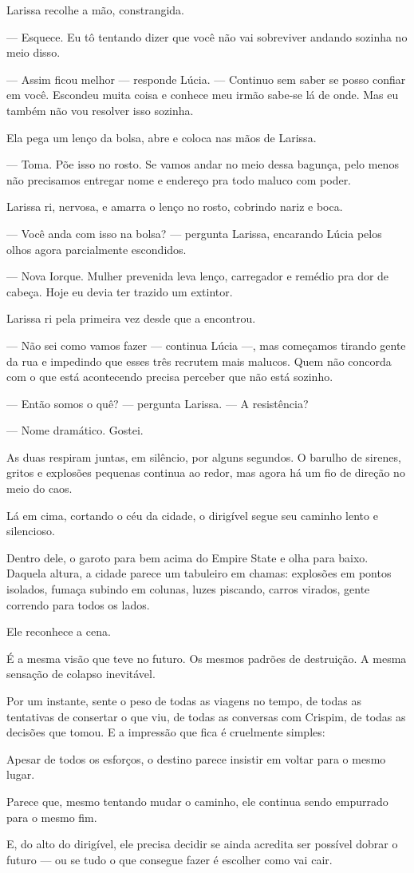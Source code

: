 Larissa recolhe a mão, constrangida.

— Esquece. Eu tô tentando dizer que você não vai sobreviver andando sozinha no meio disso.

— Assim ficou melhor — responde Lúcia. — Continuo sem saber se posso confiar em você. Escondeu muita coisa e conhece meu irmão sabe-se lá de onde. Mas eu também não vou resolver isso sozinha.

Ela pega um lenço da bolsa, abre e coloca nas mãos de Larissa.

— Toma. Põe isso no rosto. Se vamos andar no meio dessa bagunça, pelo menos não precisamos entregar nome e endereço pra todo maluco com poder.

Larissa ri, nervosa, e amarra o lenço no rosto, cobrindo nariz e boca.

— Você anda com isso na bolsa? — pergunta Larissa, encarando Lúcia pelos olhos agora parcialmente escondidos.

— Nova Iorque. Mulher prevenida leva lenço, carregador e remédio pra dor de cabeça. Hoje eu devia ter trazido um extintor.

Larissa ri pela primeira vez desde que a encontrou.

— Não sei como vamos fazer — continua Lúcia —, mas começamos tirando gente da rua e impedindo que esses três recrutem mais malucos. Quem não concorda com o que está acontecendo precisa perceber que não está sozinho.

— Então somos o quê? — pergunta Larissa. — A resistência?

— Nome dramático. Gostei.

As duas respiram juntas, em silêncio, por alguns segundos.  
O barulho de sirenes, gritos e explosões pequenas continua ao redor, mas agora há um fio de direção no meio do caos.

\bigskip

Lá em cima, cortando o céu da cidade, o dirigível segue seu caminho lento e silencioso.

Dentro dele, o garoto para bem acima do Empire State e olha para baixo.  
Daquela altura, a cidade parece um tabuleiro em chamas:  
explosões em pontos isolados, fumaça subindo em colunas, luzes piscando, carros virados, gente correndo para todos os lados.

Ele reconhece a cena.

É a mesma visão que teve no futuro.  
Os mesmos padrões de destruição.  
A mesma sensação de colapso inevitável.

Por um instante, sente o peso de todas as viagens no tempo, de todas as tentativas de consertar o que viu, de todas as conversas com Crispim, de todas as decisões que tomou.  
E a impressão que fica é cruelmente simples:

Apesar de todos os esforços, o destino parece insistir em voltar para o mesmo lugar.

Parece que, mesmo tentando mudar o caminho, ele continua sendo empurrado para o mesmo fim.

E, do alto do dirigível, ele precisa decidir se ainda acredita ser possível dobrar o futuro — ou se tudo o que consegue fazer é escolher como vai cair.
